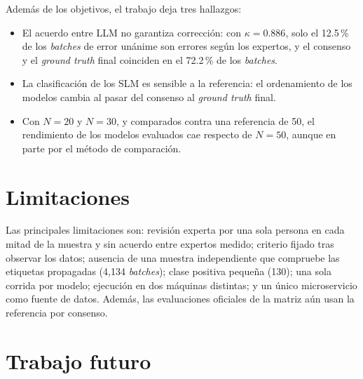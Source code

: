 Además de los objetivos, el trabajo deja tres hallazgos:

\begin{itemize}
  \item El acuerdo entre LLM no garantiza corrección: con $\kappa=0.886$, solo el 12.5\,\% de los \textit{batches} de error unánime son errores según los expertos, y el consenso y el \textit{ground truth} final coinciden en el 72.2\,\% de los \textit{batches}.
  \item La clasificación de los SLM es sensible a la referencia: el ordenamiento de los modelos cambia al pasar del consenso al \textit{ground truth} final.
  \item Con $N=20$ y $N=30$, y comparados contra una referencia de 50, el rendimiento de los modelos evaluados cae respecto de $N=50$, aunque en parte por el método de comparación.
\end{itemize}

\section{Limitaciones}\label{sec:limitaciones}

Las principales limitaciones son: revisión experta por una sola persona en cada mitad de la muestra y sin acuerdo entre expertos medido; criterio fijado tras observar los datos; ausencia de una muestra independiente que compruebe las etiquetas propagadas (4{,}134 \textit{batches}); clase positiva pequeña (130); una sola corrida por modelo; ejecución en dos máquinas distintas; y un único microservicio como fuente de datos. Además, las evaluaciones oficiales de la matriz aún usan la referencia por consenso.

\section{Trabajo futuro}\label{sec:trabajo_futuro}

